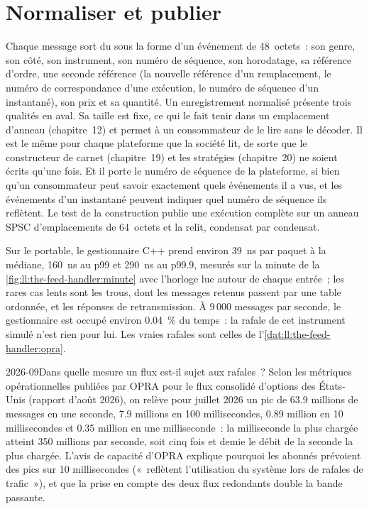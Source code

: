 \section{Normaliser et publier}

Chaque message sort du  sous la forme d'un événement de 48~octets~: son genre, son côté, son instrument, son numéro de séquence, son horodatage, sa référence d'ordre,
une seconde référence (la nouvelle référence d'un remplacement, le numéro de correspondance d'une exécution, le numéro de séquence d'un instantané), son prix et sa quantité.
Un enregistrement normalisé présente trois qualités en aval. Sa taille est fixe, ce qui le fait tenir dans un emplacement d'anneau
(chapitre~12) et permet à un consommateur de le lire sans le décoder. Il est le même pour chaque plateforme que la société lit, de sorte que le constructeur de carnet
(chapitre~19) et les stratégies (chapitre~20) ne soient écrits qu'une fois. Et il porte le numéro de séquence de la plateforme, si bien qu'un consommateur peut
savoir exactement quels événements il a vus, et les événements d'un instantané peuvent indiquer quel numéro de séquence ils reflètent.
Le test de la construction publie une exécution complète sur un anneau SPSC d'emplacements de 64~octets et la relit, condensat par condensat.

Sur le portable, le gestionnaire C++ prend environ \qty{39}{\nano\second} par paquet à la médiane, \qty{160}{\nano\second} au p99
et \qty{290}{\nano\second} au p99.9, mesurés sur la minute de la \cref{fig:ll:the-feed-handler:minute} avec l'horloge lue
autour de chaque entrée~; les rares cas lents sont les trous, dont les messages retenus passent par une table ordonnée, et les réponses de retransmission.
À 9\,000 messages par seconde, le gestionnaire est occupé environ 0.04~\% du temps~: la rafale de cet instrument simulé n'est rien
pour lui. Les vraies rafales sont celles de l'\cref{dat:ll:the-feed-handler:opra}.

\begin{dated}{2026-09}{Dans quelle mesure un flux est-il sujet aux rafales~?}\label{dat:ll:the-feed-handler:opra}
Selon les métriques opérationnelles publiées par OPRA pour le flux consolidé d'options des États-Unis (rapport d'août 2026), on relève pour juillet 2026 un pic de
63.9 millions de messages en une seconde, 7.9 millions en 100 millisecondes, 0.89 million en 10 millisecondes et 0.35 million en
une milliseconde~: la milliseconde la plus chargée atteint 350 millions par seconde, soit cinq fois et demie le débit de la seconde la plus chargée. L'avis de capacité d'OPRA
explique pourquoi les abonnés prévoient des pics sur 10 millisecondes («~reflètent l'utilisation du système lors de rafales de trafic~»), et
que la prise en compte des deux flux redondants double la bande passante.
\end{dated}

